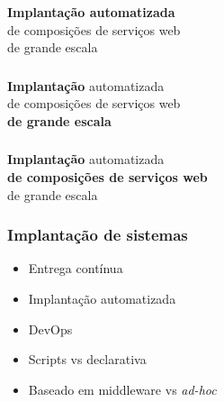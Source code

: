 \documentclass{beamer}
\newcommand\adhoc{\emph{ad-hoc}}
\begin{document}

\begin{frame}
\frametitle{}
\begin{center}
\huge
\textbf{Implantação automatizada} \\ de composições de serviços web \\ de grande escala
\end{center}
\end{frame}


\begin{frame}
\frametitle{}
\begin{center}
\huge
\textbf{Implantação} automatizada \\ de composições de serviços web \\ \textbf{de grande escala}
\end{center}
\end{frame}


\begin{frame}
\frametitle{}
\begin{center}
\huge
\textbf{Implantação} automatizada \\ \textbf{de composições de serviços web} \\ de grande escala
\end{center}
\end{frame}


\begin{frame}
\frametitle{Implantação de sistemas}

\begin{itemize}
\item Entrega contínua
\item Implantação automatizada
\item DevOps
\item Scripts vs declarativa
\item Baseado em middleware vs \adhoc
\end{itemize}

\end{frame}

\end{document}
